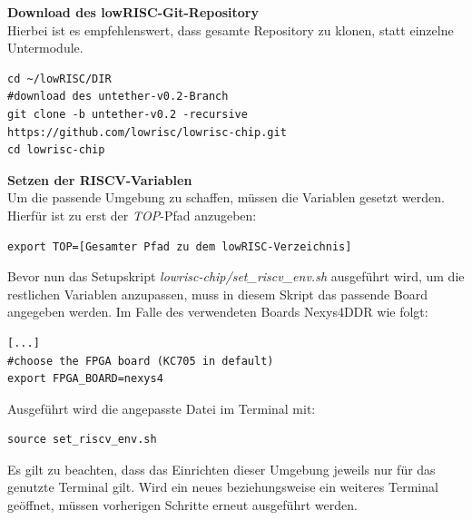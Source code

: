 \textbf{Download des lowRISC-Git-Repository}\\

Hierbei ist es empfehlenswert, dass gesamte Repository zu klonen, statt einzelne Untermodule.\\

\begin{lstlisting}[caption={Download des Repositories},label={code:riscrepository}]
cd ~/lowRISC/DIR
#download des untether-v0.2-Branch
git clone -b untether-v0.2 -recursive https://github.com/lowrisc/lowrisc-chip.git
cd lowrisc-chip
\end{lstlisting}


\vspace{5mm}
\textbf{Setzen der RISCV-Variablen}\\

Um die passende Umgebung zu schaffen, müssen die Variablen gesetzt werden. Hierfür ist zu erst der \emph{TOP}-Pfad anzugeben:\\

\begin{lstlisting}[caption={Setzen der TOP-Variable},label={code:topvariable}]
export TOP=[Gesamter Pfad zu dem lowRISC-Verzeichnis]
\end{lstlisting}



Bevor nun das Setupskript \emph{lowrisc-chip/set\_riscv\_env.sh} ausgeführt wird, um die restlichen Variablen anzupassen, muss in diesem Skript das passende Board angegeben werden.
Im Falle des verwendeten Boards Nexys4DDR wie folgt:\\

\begin{lstlisting}[caption={Anpassung des Zielsystems},label={code:zielsystem}]
[...]
#choose the FPGA board (KC705 in default)
export FPGA_BOARD=nexys4
\end{lstlisting}


Ausgeführt wird die angepasste Datei im Terminal mit:\\

\begin{lstlisting}[caption={Umgebungsvariablen},label={code:umgebungsvariablen}]
source set_riscv_env.sh
\end{lstlisting}

Es gilt zu beachten, dass das Einrichten dieser Umgebung jeweils nur für das genutzte Terminal gilt. Wird ein neues beziehungsweise ein weiteres Terminal geöffnet, müssen vorherigen Schritte erneut ausgeführt werden.\\

